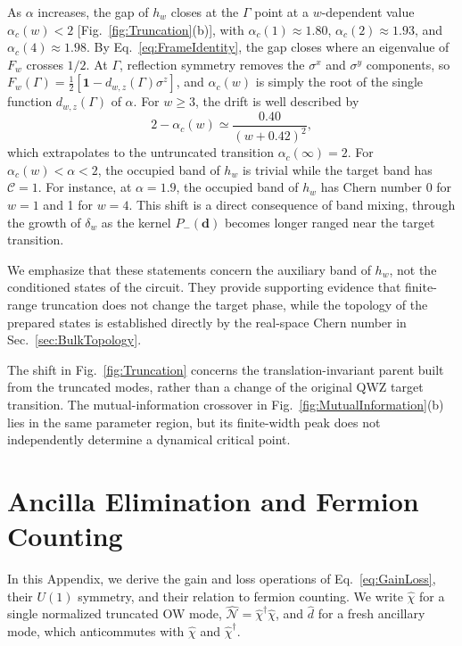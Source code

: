 \documentclass[aps,prb,10pt,twocolumn,superscriptaddress,longbibliography,floatfix]{revtex4-2}
\newcommand{\mc}[1]{\mathcal{#1}}
\newcommand{\Id}{\mathbf{1}}
\newcommand{\claudeadd}[1]{{\color{orange}#1}}
\begin{document}
As $\alpha$ increases, the gap of $h_w$ closes at the $\Gamma$ point at a $w$-dependent value $\alpha_c(w)<2$ [Fig.~\ref{fig:Truncation}(b)], with $\alpha_c(1)\approx1.80$, $\alpha_c(2)\approx1.93$, and $\alpha_c(4)\approx1.98$. \claudeadd{By Eq.~\eqref{eq:FrameIdentity}, the gap closes where an eigenvalue of $F_w$ crosses $1/2$. At $\Gamma$, reflection symmetry removes the $\sigma^x$ and $\sigma^y$ components, so $F_w(\Gamma)=\frac12[\Id-d_{w,z}(\Gamma)\sigma^z]$, and $\alpha_c(w)$ is simply the root of the single function $d_{w,z}(\Gamma)$ of $\alpha$.} For $w\geq3$, the drift is well described by
\begin{equation}
    2-\alpha_c(w)\simeq\frac{0.40}{(w+0.42)^2},
    \label{eq:CriticalDrift}
\end{equation}
which extrapolates to the untruncated transition $\alpha_c(\infty)=2$. For $\alpha_c(w)<\alpha<2$, the occupied band of $h_w$ is trivial while the target band has $\mc C=1$. For instance, at $\alpha=1.9$, the occupied band of $h_w$ has Chern number 0 for $w=1$ and 1 for $w=4$. This shift is a direct consequence of band mixing\claudeadd{, through the growth of $\delta_w$ as the kernel $P_-(\boldsymbol d)$ becomes longer ranged near the target transition}.

\claudeadd{We emphasize that these statements concern the auxiliary band of $h_w$, not the conditioned states of the circuit. They provide supporting evidence that finite-range truncation does not change the target phase, while the topology of the prepared states is established directly by the real-space Chern number in Sec.~\ref{sec:BulkTopology}.}

{\color{blue}
The shift in Fig.~\ref{fig:Truncation} concerns the translation-invariant parent built from the truncated modes, rather than a change of the original QWZ target transition. The mutual-information crossover in Fig.~\ref{fig:MutualInformation}(b) lies in the same parameter region, but its finite-width peak does not independently determine a dynamical critical point.
}

\FloatBarrier
\section{Ancilla Elimination and Fermion Counting}
\label{app:FermionCounting}

In this Appendix, we derive the gain and loss operations of Eq.~\eqref{eq:GainLoss}, their $U(1)$ symmetry, and their relation to fermion counting. We write $\hat\chi$ for a single normalized truncated OW mode, $\hat{\mc N}=\hat\chi^\dagger\hat\chi$, and $\hat d$ for a fresh ancillary mode, which anticommutes with $\hat\chi$ and $\hat\chi^\dagger$.
\end{document}
